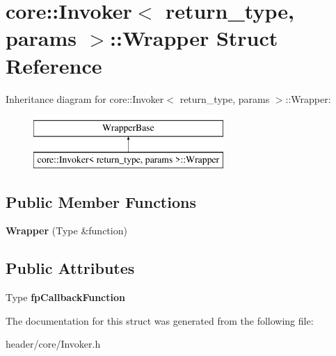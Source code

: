 \hypertarget{structcore_1_1_invoker_1_1_wrapper}{}\section{core\+:\+:Invoker$<$ return\+\_\+type, params $>$\+:\+:Wrapper Struct Reference}
\label{structcore_1_1_invoker_1_1_wrapper}
Inheritance diagram for core\+:\+:Invoker$<$ return\+\_\+type, params $>$\+:\+:Wrapper\+:\begin{figure}[H]
\begin{center}
\leavevmode
\includegraphics[height=2.000000cm]{d2/dc3/structcore_1_1_invoker_1_1_wrapper}
\end{center}
\end{figure}
\subsection*{Public Member Functions}
\begin{DoxyCompactItemize}
\item 
\mbox{\label{structcore_1_1_invoker_1_1_wrapper_a11ad844c269cc8227de9438bc7bcf79c}} 
{\bfseries Wrapper} (Type \&function)
\end{DoxyCompactItemize}
\subsection*{Public Attributes}
\begin{DoxyCompactItemize}
\item 
\mbox{\label{structcore_1_1_invoker_1_1_wrapper_a98f4a6e63c598d6f610840cc54f6b452}} 
Type {\bfseries fp\+Callback\+Function}
\end{DoxyCompactItemize}


The documentation for this struct was generated from the following file\+:\begin{DoxyCompactItemize}
\item 
header/core/Invoker.\+h\end{DoxyCompactItemize}
